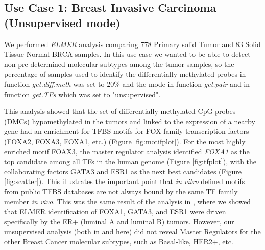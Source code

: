 \subsection{Use Case 1: Breast Invasive Carcinoma (Unsupervised mode)}

We performed \textit{ELMER} analysis comparing 778 Primary solid Tumor and 83 Solid Tissue Normal BRCA samples.  In this use case we wanted to be able to detect non pre-determined molecular subtypes among the tumor samples, so the percentage of samples used to identify the differentially methylated probes in function \textit{get.diff.meth}  was set to 20\% and the mode in function \textit{get.pair} and in function \textit{get.TFs} which was set to "unsupervised".

This analysis showed that the set of differentially methylated CpG probes (DMCs) hypomethylated in the tumors and linked to the expression of a nearby gene had an enrichment for TFBS motifs for FOX family transcription factors (FOXA2, FOXA3, FOXA1, etc.) (Figure \ref{fig:motifplot}). For the most highly enriched motif FOAX3, the master regulator analysis identified \textit{FOXA1} as the top candidate among all TFs in the human genome (Figure \ref{fig:tfplot}), with the collaborating factors GATA3 and ESR1 as the next best candidates (Figure \ref{fig:scatter}). This illustrates the important point that \textit{in vitro} defined motifs from public TFBS databases are not always bound by the same TF family member \textit{in vivo}. This was the same result of the analysis in \citeauthor{yao2015inferring}, where we showed that ELMER identification of FOXA1, GATA3, and ESR1 were driven specifically by the ER+ (luminal A and luminal B) tumors. However, our unsupervised analysis (both in \citeauthor{yao2015inferring} and here) did not reveal Master Regulators for the other Breast Cancer molecular subtypes, such as Basal-like, HER2+, etc.

